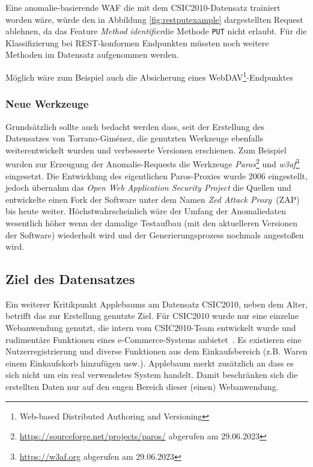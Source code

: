Eine anomalie-basierende WAF die mit dem CSIC2010-Datensatz trainiert worden wäre, würde den in Abbildung \ref{fig:restputexample} dargestellten Request ablehnen, da das Feature \glqq\emph{Method identifier}\grqq die Methode \verb=PUT= nicht erlaubt. Für die Klassifizierung bei REST-konformen Endpunkten müssten noch weitere Methoden im Datensatz aufgenommen werden.

Möglich wäre zum Beispiel auch die Absicherung eines WebDAV\footnote{Web-based Distributed Authoring and Versioning}-Endpunktes





\subsubsection{Neue Werkzeuge}
\label{sec:neuewerkzeuge}

Grundsätzlich sollte auch bedacht werden dass, seit der Erstellung des Datensatzes von Torrano-Giménez, die genutzten Werkzeuge ebenfalls weiterentwickelt wurden und verbesserte Versionen erschienen. Zum Beispiel wurden zur Erzeugung der Anomalie-Requests die Werkzeuge \emph{Paros}\footnote{\url{https://sourceforge.net/projects/paros/} abgerufen am 29.06.2023} und \emph{w3af}\footnote{\url{https://w3af.org} abgerufen am 29.06.2023} eingesetzt. Die Entwicklung des eigentlichen Paros-Proxies wurde 2006 eingestellt, jedoch übernahm das \emph{Open Web Application Security Project} die Quellen und entwickelte einen Fork der Software unter dem Namen \emph{Zed Attack Proxy}~(ZAP) bis heute weiter. Höchstwahrscheinlich wäre der Umfang der Anomaliedaten wesentlich höher wenn der damalige Testaufbau (mit den aktuelleren Versionen der Software) wiederholt wird und der Generierungsprozess nochmals angestoßen wird.
  
\subsection{Ziel des Datensatzes}
\label{sec:zieldesdatensatzes}

Ein weiterer Kritikpunkt Applebaums am Datensatz CSIC2010, neben dem Alter, betrifft das zur Erstellung genutzte Ziel. Für CSIC2010 wurde nur eine einzelne Webanwendung genutzt, die intern vom CSIC2010-Team entwickelt wurde und rudimentäre Funktionen eines e-Commerce-Systems anbietet~\cite{csic2010}. Es existieren eine Nutzerregistrierung und diverse Funktionen aus dem Einkaufsbereich (z.B. Waren einem Einkaufskorb hinzufügen usw.). Applebaum merkt zusätzlich an dass es sich nicht um ein real verwendetes System handelt. Damit beschränken sich die erstellten Daten nur auf den engen Bereich dieser (einen) Webanwendung. 

